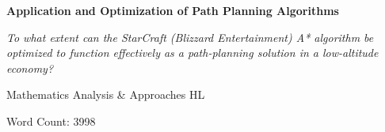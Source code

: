 \documentclass[12pt]{article}
\begin{document}
\begin{titlepage}
    \centering
    
    {\Huge\bfseries Application and Optimization of Path Planning Algorithms\par}
    
    \vspace{1in}
    
    {\Large\itshape To what extent can the StarCraft (Blizzard Entertainment) A* algorithm be optimized to function effectively as a path-planning solution in a low-altitude economy?\par}
    
    \vspace{1in}
    
    {\Large Mathematics Analysis \& Approaches HL\par}

    \vspace{1in}
    
    {\Large Word Count: 3998\par} %

\end{titlepage}
\tableofcontents

\newpage
\end{document}
